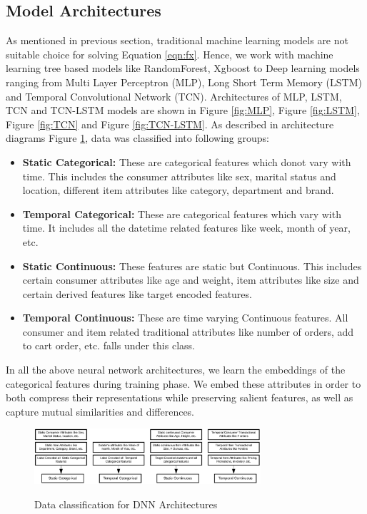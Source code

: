 \subsection{Model Architectures}
As mentioned in previous section, traditional machine learning models are not suitable choice for solving Equation \ref{eqn:fx}. 
Hence, we work with machine learning tree based models like RandomForest, Xgboost \cite{chen2016xgboost} 
to Deep learning models ranging from Multi Layer Perceptron (MLP), Long Short 
Term Memory (LSTM) and Temporal Convolutional Network (TCN). Architectures of MLP, LSTM, TCN and TCN-LSTM 
models are shown in Figure \ref{fig:MLP}, Figure \ref{fig:LSTM}, Figure \ref{fig:TCN}
and Figure \ref{fig:TCN-LSTM}. As described in architecture diagrams Figure \ref{fig:dnndata}, data was classified 
into following groups:
\begin{itemize}
\item {\bf Static Categorical:} These are categorical features which donot vary with time. This includes the consumer
attributes like sex, marital status and location, different item attributes like category, department and brand.
\item {\bf Temporal Categorical:} These are categorical features which vary with time. It includes all the datetime 
related features like week, month of year, etc.
\item {\bf Static Continuous:} These features are static but Continuous. This includes certain consumer attributes like
age and weight, item attributes like size and certain derived features like target encoded features.
\item {\bf Temporal Continuous:} These are time varying Continuous features. All consumer and item related
traditional attributes like number of orders, add to cart order, etc. falls under this class.
\end{itemize}
In all the above neural network architectures, we learn the embeddings \cite{guo2016entity} of the categorical features during training phase.
We embed these attributes in order to both compress their representations while preserving
salient features, as well as capture mutual similarities and differences.
  \begin{figure}[t]
    \centering 
    \caption{Data classification for DNN Architectures} 
    \includegraphics[width=3.3in]{img/dnndata.png} 
    \label{fig:dnndata} 
  \end{figure}
